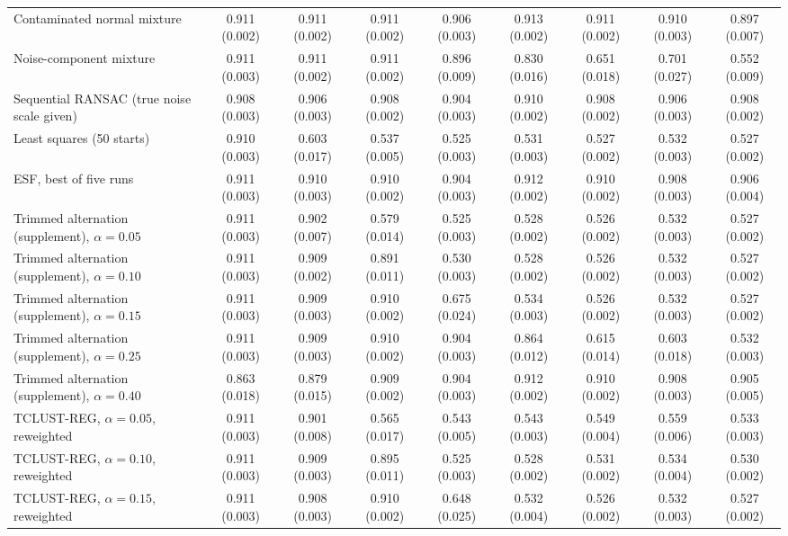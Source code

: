 \begin{table}[htbp]
{\begin{tabular}{lcccccccc}
Contaminated normal mixture & 0.911 (0.002) & 0.911 (0.002) & 0.911 (0.002) & 0.906 (0.003) & 0.913 (0.002) & 0.911 (0.002) & 0.910 (0.003) & 0.897 (0.007) \\
Noise-component mixture & 0.911 (0.003) & 0.911 (0.002) & 0.911 (0.002) & 0.896 (0.009) & 0.830 (0.016) & 0.651 (0.018) & 0.701 (0.027) & 0.552 (0.009) \\
Sequential RANSAC (true noise scale given) & 0.908 (0.003) & 0.906 (0.003) & 0.908 (0.002) & 0.904 (0.003) & 0.910 (0.002) & 0.908 (0.002) & 0.906 (0.003) & 0.908 (0.002) \\
Least squares (50 starts) & 0.910 (0.003) & 0.603 (0.017) & 0.537 (0.005) & 0.525 (0.003) & 0.531 (0.003) & 0.527 (0.002) & 0.532 (0.003) & 0.527 (0.002) \\
ESF, best of five runs & 0.911 (0.003) & 0.910 (0.003) & 0.910 (0.002) & 0.904 (0.003) & 0.912 (0.002) & 0.910 (0.002) & 0.908 (0.003) & 0.906 (0.004) \\
Trimmed alternation (supplement), $\alpha=0.05$ & 0.911 (0.003) & 0.902 (0.007) & 0.579 (0.014) & 0.525 (0.003) & 0.528 (0.002) & 0.526 (0.002) & 0.532 (0.003) & 0.527 (0.002) \\
Trimmed alternation (supplement), $\alpha=0.10$ & 0.911 (0.003) & 0.909 (0.002) & 0.891 (0.011) & 0.530 (0.003) & 0.528 (0.002) & 0.526 (0.002) & 0.532 (0.003) & 0.527 (0.002) \\
Trimmed alternation (supplement), $\alpha=0.15$ & 0.911 (0.003) & 0.909 (0.003) & 0.910 (0.002) & 0.675 (0.024) & 0.534 (0.003) & 0.526 (0.002) & 0.532 (0.003) & 0.527 (0.002) \\
Trimmed alternation (supplement), $\alpha=0.25$ & 0.911 (0.003) & 0.909 (0.003) & 0.910 (0.002) & 0.904 (0.003) & 0.864 (0.012) & 0.615 (0.014) & 0.603 (0.018) & 0.532 (0.003) \\
Trimmed alternation (supplement), $\alpha=0.40$ & 0.863 (0.018) & 0.879 (0.015) & 0.909 (0.002) & 0.904 (0.003) & 0.912 (0.002) & 0.910 (0.002) & 0.908 (0.003) & 0.905 (0.005) \\
TCLUST-REG, $\alpha=0.05$, reweighted & 0.911 (0.003) & 0.901 (0.008) & 0.565 (0.017) & 0.543 (0.005) & 0.543 (0.003) & 0.549 (0.004) & 0.559 (0.006) & 0.533 (0.003) \\
TCLUST-REG, $\alpha=0.10$, reweighted & 0.911 (0.003) & 0.909 (0.003) & 0.895 (0.011) & 0.525 (0.003) & 0.528 (0.002) & 0.531 (0.002) & 0.534 (0.004) & 0.530 (0.002) \\
TCLUST-REG, $\alpha=0.15$, reweighted & 0.911 (0.003) & 0.908 (0.003) & 0.910 (0.002) & 0.648 (0.025) & 0.532 (0.004) & 0.526 (0.002) & 0.532 (0.003) & 0.527 (0.002) \\
\bottomrule
\end{tabular}}
\end{table}

